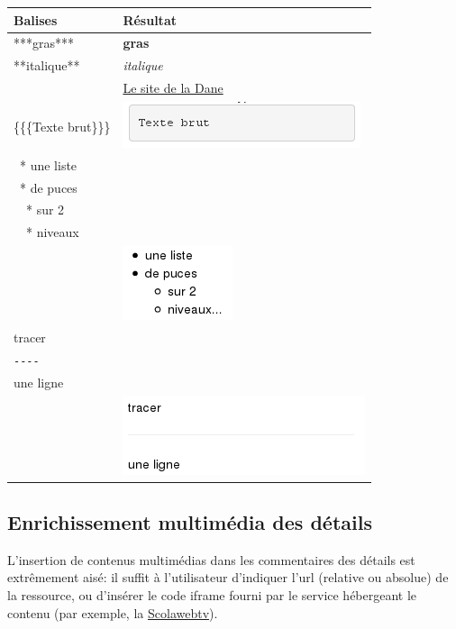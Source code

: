 \documentclass[a4paper,12pt]{report}
\begin{document}
\begin{center}
 \begin{tabular}{|l|l|}
 \hline
  Balises & Résultat\\
  \hline
  \hline
  ***gras*** & \textbf{gras}\\
  \hline
  **italique** & \textit{italique}\\
  \hline
  [http://dane.ac-versailles.fr Le site de la Dane] & \href{http://dane.ac-versailles/fr}{Le site de la Dane}\\
  \hline
  \{\{\{Texte brut\}\}\} & \includegraphics[scale=0.7]{./images/texte_brut}\\
  \hline
  ~* une liste\\
  ~* de puces\\
  ~~* sur 2\\
  ~~* niveaux\\ & \includegraphics[scale=0.7]{./images/liste_puce}\\
  \hline
  tracer\\
  \verb|----|\\
  une ligne\\ & \includegraphics[scale=0.7]{./images/ligne_commentaire}
  \end{tabular}
\end{center}

\subsection{Enrichissement multimédia des détails}

L'insertion de contenus multimédias dans les commentaires des détails est extrêmement aisé:
il suffit à l'utilisateur d'indiquer l'url (relative ou absolue) de la ressource, ou d'insérer le code iframe
fourni par le service hébergeant le contenu (par exemple, la \href{https://scolawebtv.crdp-versailles.fr/}{Scolawebtv}).
\end{document}
